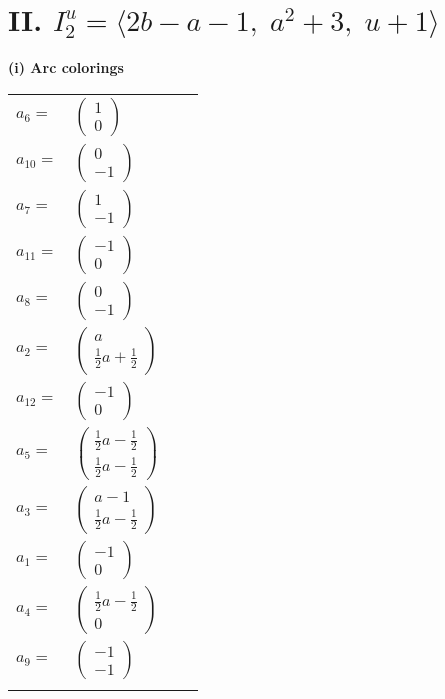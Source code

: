 \documentclass[1p]{elsarticle_modified}
\theoremstyle{definition}
\begin{document}
\centering \section*{II. $I^u_{2}= \langle 2 b- a-1,\;a^2+3,\;u+1 \rangle$}
\flushleft \textbf{(i) Arc colorings}\\
\begin{tabular}{m{7pt} m{180pt} m{7pt} m{180pt} }
\flushright $a_{6}=$&$\begin{pmatrix}1\\0\end{pmatrix}$ \\
\flushright $a_{10}=$&$\begin{pmatrix}0\\-1\end{pmatrix}$ \\
\flushright $a_{7}=$&$\begin{pmatrix}1\\-1\end{pmatrix}$ \\
\flushright $a_{11}=$&$\begin{pmatrix}-1\\0\end{pmatrix}$ \\
\flushright $a_{8}=$&$\begin{pmatrix}0\\-1\end{pmatrix}$ \\
\flushright $a_{2}=$&$\begin{pmatrix}a\\\frac{1}{2} a+\frac{1}{2}\end{pmatrix}$ \\
\flushright $a_{12}=$&$\begin{pmatrix}-1\\0\end{pmatrix}$ \\
\flushright $a_{5}=$&$\begin{pmatrix}\frac{1}{2} a-\frac{1}{2}\\\frac{1}{2} a-\frac{1}{2}\end{pmatrix}$ \\
\flushright $a_{3}=$&$\begin{pmatrix}a-1\\\frac{1}{2} a-\frac{1}{2}\end{pmatrix}$ \\
\flushright $a_{1}=$&$\begin{pmatrix}-1\\0\end{pmatrix}$ \\
\flushright $a_{4}=$&$\begin{pmatrix}\frac{1}{2} a-\frac{1}{2}\\0\end{pmatrix}$ \\
\flushright $a_{9}=$&$\begin{pmatrix}-1\\-1\end{pmatrix}$\\&\end{tabular}
\end{document}
